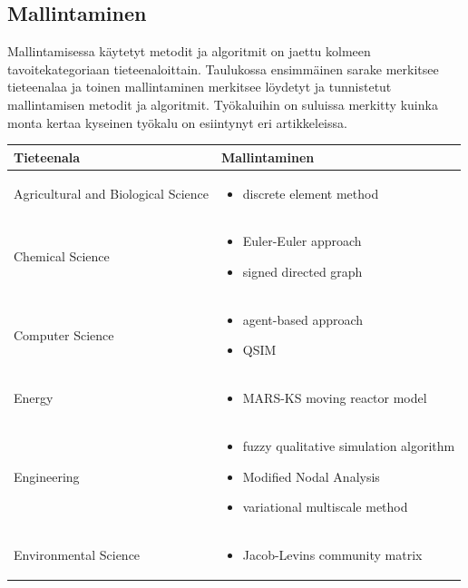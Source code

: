 \documentclass[utf8]{gradu3}
\begin{document}
\subsection{Mallintaminen}
Mallintamisessa käytetyt metodit ja algoritmit on jaettu kolmeen
tavoitekategoriaan tieteenaloittain. Taulukossa ensimmäinen sarake merkitsee
tieteenalaa  ja toinen mallintaminen merkitsee löydetyt ja tunnistetut 
mallintamisen metodit ja algoritmit. Työkaluihin on suluissa merkitty 
kuinka monta kertaa kyseinen työkalu on esiintynyt eri artikkeleissa.

\begin{longtable}[h]{|p{5cm}|p{8cm}|}
    \hline
    \textbf{Tieteenala}    &    \textbf{Mallintaminen}\\
    \hline
    Agricultural and Biological Science & \begin{itemize}
        \item discrete element method
    \end{itemize} \\
    \hline
    Chemical Science & \begin{itemize}
        \item Euler-Euler approach
        \item signed directed graph
    \end{itemize} \\
    \hline
    Computer Science & \begin{itemize}
        \item agent-based approach
        \item QSIM
    \end{itemize} \\
    \hline
    Energy & \begin{itemize}
        \item MARS-KS moving reactor model
    \end{itemize} \\
    \hline
    Engineering & \begin{itemize}
        \item fuzzy qualitative simulation algorithm
        \item Modified Nodal Analysis
        \item variational multiscale method
    \end{itemize} \\
    \hline
    Environmental Science & \begin{itemize}
        \item Jacob-Levins community matrix

\end{itemize}
\end{longtable}
\end{document}
